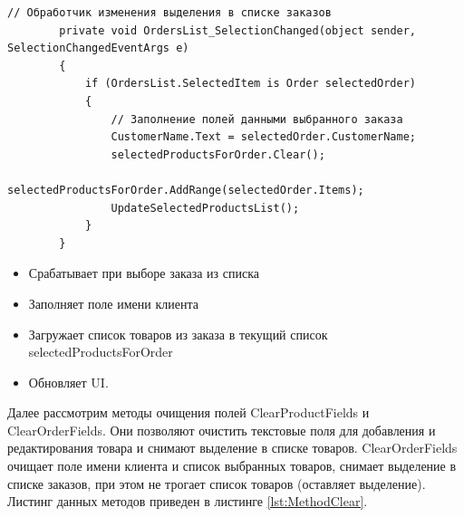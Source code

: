 \documentclass[12pt]{article}
\newcommand{\colorGIT}[1]{\textcolor{CtpGreen}{#1}}
\begin{document}
\begin{lstlisting}[style=csharp_catppuccin, caption=\colorGIT{\href{https://github.com/WebMasterIT/Csharp_Labs/blob/ec375afd16c0647b337cf3d8a79c8bef904fc1be/3lab/StoreManager/MainWindow.xaml.cs\#L82-L110}{Метод}} обновления нового товара, label=lst:MethodUpdate3]
        // Обработчик изменения выделения в списке заказов
        private void OrdersList_SelectionChanged(object sender, SelectionChangedEventArgs e)
        {
            if (OrdersList.SelectedItem is Order selectedOrder)
            {
                // Заполнение полей данными выбранного заказа
                CustomerName.Text = selectedOrder.CustomerName;
                selectedProductsForOrder.Clear();
                selectedProductsForOrder.AddRange(selectedOrder.Items);
                UpdateSelectedProductsList();
            }
        }
\end{lstlisting}

\begin{itemize}
	\item Срабатывает при выборе заказа из списка
	\item Заполняет поле имени клиента
	\item Загружает список товаров из заказа в текущий список selectedProductsForOrder
	\item Обновляет UI.
\end{itemize}

\pagebreak

Далее рассмотрим методы очищения полей ClearProductFields и ClearOrderFields. Они позволяют очистить текстовые поля для добавления и редактирования товара и снимают выделение в списке товаров. ClearOrderFields очищает поле имени клиента и список выбранных товаров, снимает выделение в списке заказов, при этом не трогает список товаров (оставляет выделение). Листинг данных методов приведен в листинге \ref{lst:MethodClear}.
\end{document}
